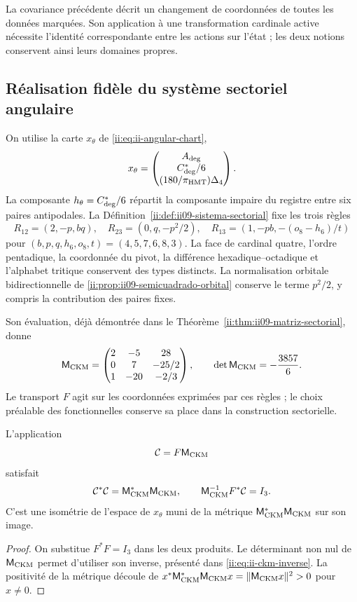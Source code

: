 La covariance précédente décrit un changement de coordonnées de toutes les
données marquées. Son application à une transformation cardinale active nécessite
l’identité correspondante entre les actions sur l’état ; les deux
notions conservent ainsi leurs domaines propres.

\subsection{Réalisation fidèle du système sectoriel angulaire}

On utilise la carte \(x_\theta\) de \eqref{ii:eq:ii-angular-chart},
\[
 x_\theta=\begin{pmatrix}A_{\rm deg}\\C^*_{\rm deg}/6\\
                              (180/\pi_{\rm HMT})\Delta_4\end{pmatrix}.
\]
La composante \(h_\theta=C^*_{\rm deg}/6\) répartit la composante
impaire du registre entre six paires antipodales. La
Définition~\ref{ii:def:ii09-sistema-sectorial} fixe les trois règles
\[
 R_{12}=(2,-p,bq),\quad R_{23}=(0,q,-p^2/2),\quad
 R_{13}=(1,-pb,-(o_8-h_6)/t)
\]
pour \((b,p,q,h_6,o_8,t)=(4,5,7,6,8,3)\). La face de cardinal
quatre, l’ordre pentadique, la coordonnée du pivot, la différence
hexadique--octadique et l’alphabet tritique conservent des types distincts.
La normalisation orbitale bidirectionnelle de
\ref{ii:prop:ii09-semicuadrado-orbital} conserve le terme \(p^2/2\),
y compris la contribution des paires fixes.

Son évaluation, déjà démontrée dans le
Théorème~\ref{ii:thm:ii09-matriz-sectorial}, donne
\[
 \mathsf M_{\rm CKM}=
 \begin{pmatrix}2&-5&28\\0&7&-25/2\\1&-20&-2/3\end{pmatrix},
 \qquad\det\mathsf M_{\rm CKM}=-\frac{3857}{6}.
\]
Le transport \(F\) agit sur les coordonnées exprimées par ces règles ; le choix préalable des fonctionnelles conserve sa place dans la construction sectorielle.

\begin{corollary}
\label{ii:cor:ii-witt-composed-reader}
L'application
\begin{equation}
 \mathcal C=F\mathsf M_{\rm CKM}
 \label{ii:eq:ii-witt-composed-reader}
\end{equation}
satisfait
\[
 \mathcal C^*\mathcal C=\mathsf M_{\rm CKM}^*\mathsf M_{\rm CKM},
 \qquad
 \mathsf M_{\rm CKM}^{-1}F^*\mathcal C=I_3.
\]
C’est une isométrie de l’espace de \(x_\theta\) muni de la métrique
\(\mathsf M_{\rm CKM}^*\mathsf M_{\rm CKM}\) sur son image.
\end{corollary}
\begin{proof}
On substitue \(F^*F=I_3\) dans les deux produits. Le déterminant non
nul de \(\mathsf M_{\rm CKM}\) permet d’utiliser son inverse,
présenté dans \eqref{ii:eq:ii-ckm-inverse}. La positivité de la métrique
découle de
\(x^*\mathsf M_{\rm CKM}^*\mathsf M_{\rm CKM}x
=\|\mathsf M_{\rm CKM}x\|^2>0\) pour \(x\ne0\).
\end{proof}

